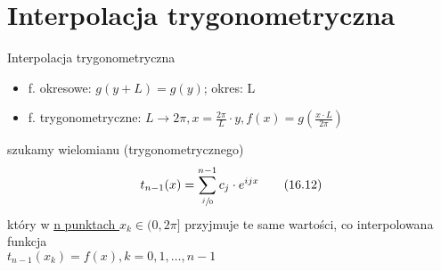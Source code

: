 \section{Interpolacja trygonometryczna}
\begin{frame}{Interpolacja trygonometryczna}
	\begin{itemize}
		\item f. okresowe: $g(y + L) = g(y)$; okres: L \\
		\item f. trygonometryczne: $L \to 2\pi, x = \frac{2\pi}{L} \cdot y, f(x) = g(\frac{x \cdot L}{2\pi})$	
	\end{itemize}
	szukamy wielomianu (trygonometrycznego)
	\[
		t_{n-1}(x) = \sum\limits_{\sfrac{j}{0}}^{n-1} c_j \cdot e^{ijx}
		\tag{16.12}
	\]
	który w \underline{n punktach $x_k \in (0, 2\pi]$} przyjmuje te same wartości, co interpolowana funkcja
	\\ $t_{n - 1}(x_k) = f(x), k = 0, 1, \dots, n - 1$
\end{frame}
